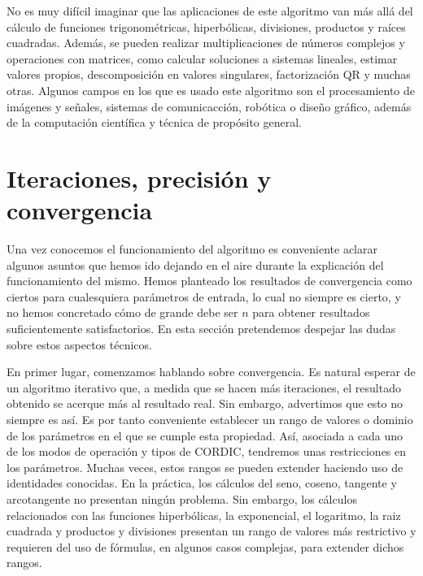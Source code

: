 \documentclass[12pt, a4paper]{article}
\begin{document}
No es muy difícil imaginar que las aplicaciones de este algoritmo van más allá del cálculo de funciones trigonométricas, hiperbólicas, divisiones, productos y raíces cuadradas. Además, se pueden realizar multiplicaciones de números complejos y operaciones con matrices, como calcular soluciones a sistemas lineales, estimar valores propios, descomposición en valores singulares, factorización QR y muchas otras.
Algunos campos en los que es usado este algoritmo son el procesamiento de imágenes y señales, sistemas de comunicacción, robótica o diseño gráfico, además de la computación científica y técnica de propósito general. 
\section{Iteraciones, precisión y convergencia}
Una vez conocemos el funcionamiento del algoritmo es conveniente aclarar algunos asuntos que hemos ido dejando en el aire durante la explicación del funcionamiento del mismo. Hemos planteado los resultados de convergencia como ciertos para cualesquiera parámetros de entrada, lo cual no siempre es cierto, y no hemos concretado cómo de grande debe ser $n$ para obtener resultados suficientemente satisfactorios. En esta sección pretendemos despejar las dudas sobre estos aspectos técnicos.

En primer lugar, comenzamos hablando sobre convergencia. Es natural esperar de un algoritmo iterativo que, a medida que se hacen más iteraciones, el resultado obtenido se acerque más al resultado real. Sin embargo, advertimos que esto no siempre es así. Es por tanto conveniente establecer un rango de valores o dominio de los parámetros en el que se cumple esta propiedad. Así, asociada a cada uno de los modos de operación y tipos de CORDIC, tendremos unas restricciones en los parámetros. Muchas veces, estos rangos se pueden extender haciendo uso de identidades conocidas. En la práctica, los cálculos del seno, coseno, tangente y arcotangente no presentan ningún problema. Sin embargo, los cálculos relacionados con las funciones hiperbólicas, la exponencial, el logaritmo, la raiz cuadrada y productos y divisiones presentan un rango de valores más restrictivo y requieren del uso de fórmulas, en algunos casos complejas, para extender dichos rangos.
\end{document}
